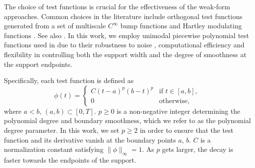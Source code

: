 \documentclass[final]{siamltex}
\def\norm#1{\|#1\|}
\begin{document}


The choice of test functions is crucial for the effectiveness of the weak-form approaches. Common choices in the literature include orthogonal test functions generated from a set of multiscale $C^{\infty}$ bump functions \cite{bortz2023direct,heitzman2025practical} and Hartley modulating functions \cite{heitzman2025practical,boulier2014algorithm}. See also \cite{tran2025weak}. In this work, we employ unimodal piecewise polynomial test functions used in \cite{messenger2021weak,tran2024weak,tang2023weakident,he2023glasdi,heitzman2025practical} due to their robustness to noise \cite{messenger2021weak,heitzman2025practical}, computational efficiency and flexibility in controlling both the support width and the degree of smoothness at the support endpoints.

Specifically, each test function is defined as
\begin{equation*}
\label{eq:test_func}
\phi(t) = \begin{cases}
    C(t-a)^p(b-t)^p &\text{if } t \in [a,b], \\ 
    0 &\text{otherwise,}
\end{cases}
\end{equation*}
where $a<b, \, (a,b)\subset [0,T]$. 
$p \geq 0$ is a non-negative integer determining the polynomial degree and boundary smoothness, which we refer to as the polynomial degree parameter.
In this work, we set $p \geq 2$ in order to ensure that the test function and its derivative vanish at the boundary points $a$, $b$.
$C$ is a normalization constant satisfying $\norm{\phi}_\infty = 1$. 
As $p$ gets larger, the decay is faster towards the endpoints of the support.
\end{document}
